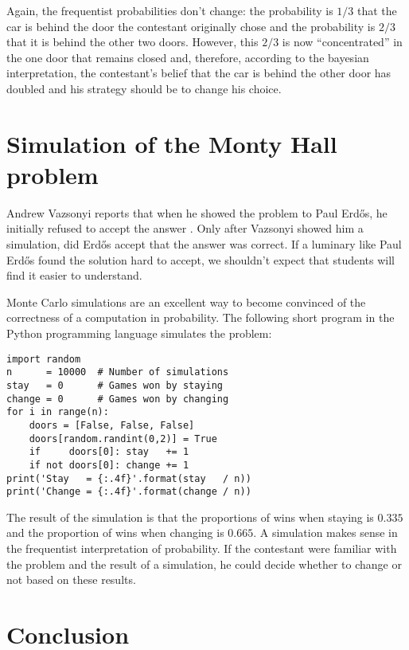 \documentclass[11pt,a4paper]{article}
\renewcommand{\baselinestretch}{1.1}
\begin{document}
Again, the frequentist probabilities don't change: the probability is $1/3$ that the car is behind the door the contestant originally chose and the probability is $2/3$ that it is behind the other two doors. However, this $2/3$ is now ``concentrated'' in the one door that remains closed and, therefore, according to the bayesian interpretation, the contestant's belief that the car is behind the other door has doubled and his strategy should be to change his choice.


\section{Simulation of the Monty Hall problem}

Andrew Vazsonyi reports that when he showed the problem to Paul Erd\H{o}s, he initially refused to accept the answer \cite[p.~17]{erdos}. Only after Vazsonyi showed him a simulation, did Erd\H{o}s accept that the answer was correct. If a luminary like Paul Erd\H{o}s found the solution hard to accept, we shouldn't expect that students will find it easier to understand.

Monte Carlo simulations are an excellent way to become convinced of the correctness of a computation in probability. The following short program in the Python programming language simulates the problem:
\renewcommand{\baselinestretch}{1.1}
\begin{verbatim}
import random
n      = 10000  # Number of simulations
stay   = 0      # Games won by staying
change = 0      # Games won by changing
for i in range(n):
    doors = [False, False, False]
    doors[random.randint(0,2)] = True
    if     doors[0]: stay   += 1
    if not doors[0]: change += 1
print('Stay   = {:.4f}'.format(stay   / n))
print('Change = {:.4f}'.format(change / n))
\end{verbatim}
The result of the simulation is that the proportions of wins when staying is $0.335$ and the proportion of wins when changing is $0.665$. A simulation makes sense in the frequentist interpretation of probability. If the contestant were familiar with the problem and the result of a simulation, he could decide whether to change or not based on these results. 


\section{Conclusion}
\end{document}
